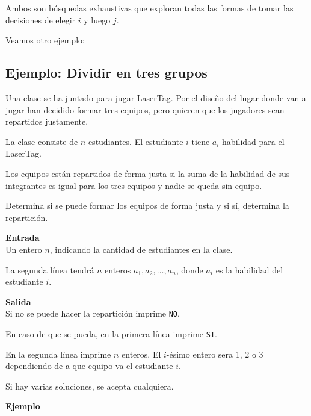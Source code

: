 Ambos son búsquedas exhaustivas que exploran todas las formas de tomar las decisiones de elegir \(i\) y luego \(j\).

Veamos otro ejemplo:

\subsection*{Ejemplo: Dividir en tres grupos}
Una clase se ha juntado para jugar LaserTag. Por el diseño del lugar donde van a jugar han decidido formar tres equipos, pero quieren que los jugadores sean repartidos justamente.

La clase consiste de \(n\) estudiantes. El estudiante \(i\) tiene \(a_i\) habilidad para el LaserTag. 

Los equipos están repartidos de forma justa si la suma de la habilidad de sus integrantes es igual para los tres equipos y nadie se queda sin equipo.

Determina si se puede formar los equipos de forma justa y si sí, determina la repartición.

\textbf{Entrada}\\
Un entero \(n\), indicando la cantidad de estudiantes en la clase.

La segunda línea tendrá \(n\) enteros \(a_1, a_2, \ldots, a_n\), donde \(a_i\) es la habilidad del estudiante \(i\).

\textbf{Salida}\\
Si no se puede hacer la repartición imprime \verb|NO|.

En caso de que se pueda, en la primera línea imprime \verb|SI|.

En la segunda línea imprime \(n\) enteros. El \(i\)-ésimo entero sera 1, 2 o 3 dependiendo de a que equipo va el estudiante \(i\). 

Si hay varias soluciones, se acepta cualquiera.

\begin{samepage}
	\textbf{Ejemplo}\\
	\begin{casebox3}
	\end{casebox3}

\end{samepage}

